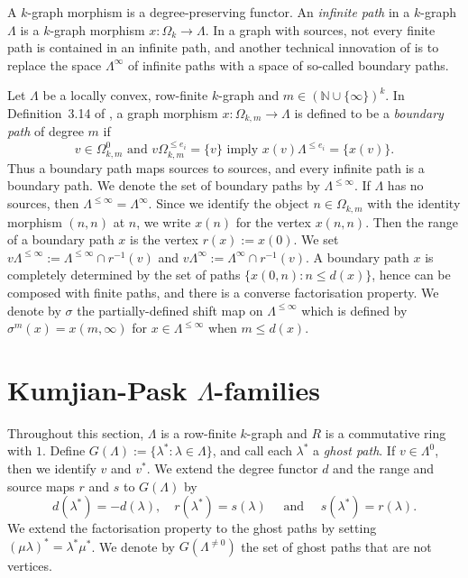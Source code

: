 \documentclass[a4paper,12pt]{amsart}
\numberwithin{equation}{section}
\theoremstyle{definition}
\theoremstyle{remark}
\begin{document}
A $k$-graph morphism is a degree-preserving functor.  An \emph{infinite path} in a $k$-graph $\Lambda$ is a $k$-graph morphism $x:\Omega_k\to \Lambda$.
In a graph with sources, not every finite path is contained in an infinite path, and 
another technical innovation of \cite{RSY03} is to replace the space $\Lambda^\infty$
of infinite paths with a space of so-called  boundary paths.

Let $\Lambda$ be  a locally convex, row-finite $k$-graph and  $m \in ({\mathbb{N}} \cup \{\infty\})^k$.  In Definition~3.14 of \cite{RSY03}, a graph morphism
$x: \Omega_{k,m} \to \Lambda$ is defined to be a \emph{boundary path} of degree $m$  
if 
\begin{equation}
 \label{eq:boundarypath}
v \in  \Omega_{k,m}^0 \text{ and }  v\Omega_{k,m}^{\leq e_i} = \{v\} \text{ imply }
x(v)\Lambda^{\leq e_i} = \{x(v)\}.
\end{equation}  
Thus a  boundary path  maps sources to sources, and every infinite path is a boundary path.  We denote the set of boundary paths by $\Lambda^{\leq \infty}$. If $\Lambda$ has no sources, then $\Lambda^{\leq\infty}=\Lambda^\infty$. 
Since we identify the object $n\in \Omega_{k,m}$ with the identity morphism $(n,n)$ at $n$, we write $x(n)$ for the vertex $x(n,n)$. Then the range of a boundary path $x$ is the vertex $r(x):=x(0)$. We set  $v\Lambda^{\leq \infty}:=\Lambda^{\leq \infty}\cap r^{-1}(v)$ and $v\Lambda^{\infty}:=\Lambda^{\infty}\cap r^{-1}(v)$.  A boundary path $x$ is completely determined by the set of paths $\{x(0,n): n\leq d(x)\}$,  hence can be composed with finite paths, and there is a converse factorisation property.  We denote by $\sigma$ the partially-defined shift map on $\Lambda^{\leq \infty}$ which
 is defined by $\sigma^m(x)=x(m,\infty)$ for $x\in \Lambda^{\leq \infty}$ when $m\leq d(x)$.

\section{Kumjian-Pask $\Lambda$-families}\label{sec-family} Throughout this section, $\Lambda$ is a row-finite $k$-graph 
and $R$ is a commutative ring with $1$.
Define  $G(\Lambda):= \{\lambda^* : \lambda \in \Lambda\}$, and call each
$\lambda^*$  a \emph{ghost path}. If $v\in\Lambda^0$, then we identify $v$ and $v^*$. 
We extend the degree functor $d$ and the range and source maps $r$ and $s$ to $G(\Lambda)$ by
\[
 d(\lambda^*) = -d(\lambda),\quad r(\lambda^*) = s(\lambda) \quad\text{ and }\quad s(\lambda^*)=r(\lambda).
\]
We extend the factorisation property to the ghost paths by setting $(\mu\lambda)^* = \lambda^*\mu^*$.  We denote by $G(\Lambda^{\neq 0})$ the set of ghost paths that are not vertices.
\end{document}
